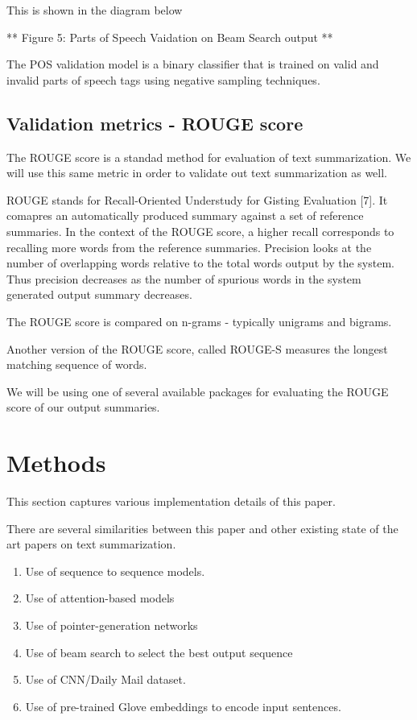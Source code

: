 \documentclass[11pt]{article}
\providecommand{\tightlist}{%
      \setlength{\itemsep}{0pt}\setlength{\parskip}{0pt}}
\begin{document}
This is shown in the diagram below

 ** Figure 5: Parts of Speech Vaidation on Beam Search output **

The POS validation model is a binary classifier that is trained on valid
and invalid parts of speech tags using negative sampling techniques.

    \subsection{Validation metrics - ROUGE
score}\label{validation-metrics---rouge-score}

The ROUGE score is a standad method for evaluation of text
summarization. We will use this same metric in order to validate out
text summarization as well.

ROUGE stands for Recall-Oriented Understudy for Gisting Evaluation
{[}7{]}. It comapres an automatically produced summary against a set of
reference summaries. In the context of the ROUGE score, a higher recall
corresponds to recalling more words from the reference summaries.
Precision looks at the number of overlapping words relative to the total
words output by the system. Thus precision decreases as the number of
spurious words in the system generated output summary decreases.

The ROUGE score is compared on n-grams - typically unigrams and bigrams.

Another version of the ROUGE score, called ROUGE-S measures the longest
matching sequence of words.

We will be using one of several available packages for evaluating the
ROUGE score of our output summaries.

    \section{Methods}\label{methods}

This section captures various implementation details of this paper.

There are several similarities between this paper and other existing
state of the art papers on text summarization.

\begin{enumerate}
\def\labelenumi{\arabic{enumi}.}
\tightlist
\item
  Use of sequence to sequence models.
\item
  Use of attention-based models
\item
  Use of pointer-generation networks
\item
  Use of beam search to select the best output sequence
\item
  Use of CNN/Daily Mail dataset.
\item
  Use of pre-trained Glove embeddings to encode input sentences.
\end{enumerate}
\end{document}
